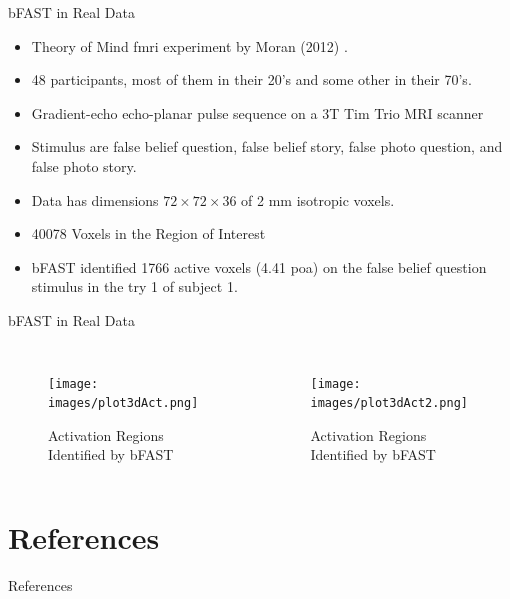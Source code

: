 \documentclass{beamer}
\begin{document}
\begin{frame}{bFAST in Real Data}
\begin{itemize}
\item Theory of Mind \gls{fmri} experiment by Moran (2012) \cite{moran2012social}.
\item 48 participants, most of them in their 20's and some other in their 70's.
\item Gradient-echo echo-planar pulse sequence on a 3T Tim Trio MRI scanner
\item Stimulus are false belief question, false belief
story, false photo question, and false photo story.
\item Data has dimensions $72\times72\times36$ of 2 mm isotropic voxels.
\item 40078 Voxels in the Region of Interest
\item bFAST identified 1766 active voxels (4.41 \gls{poa}) on the false belief 
question stimulus in the try 1 of subject 1.
\end{itemize}
\end{frame}

\begin{frame}{bFAST in Real Data}
\begin{columns}
\begin{figure}
\centering
\texttt{[image: images/plot3dAct.png]}
\caption{Activation Regions Identified by bFAST}
\end{figure}

\begin{figure}
\centering
\texttt{[image: images/plot3dAct2.png]}
\caption{Activation Regions Identified by bFAST}
\end{figure}
\end{columns}
\end{frame}

\section{References}

\begin{frame}[allowframebreaks]{References}

\end{frame}

\end{document}
